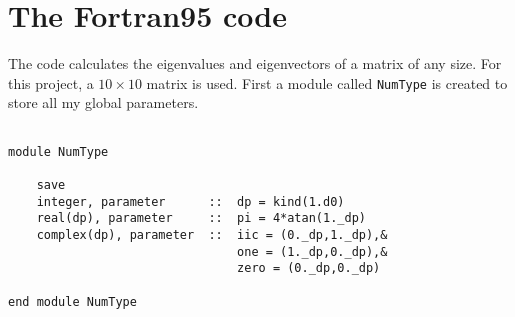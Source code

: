 \documentclass[12pt]{article}
\begin{document}
\section{The Fortran95 code}

The code calculates the eigenvalues and eigenvectors of a matrix of any size. For this project, a $10 \times 10$ matrix is used. First a module called {\tt NumType} is created to store all my global parameters.

\begin{lstlisting}[frame=single,caption={Module {\tt NumType}},label=module]

module NumType

	save
	integer, parameter		::	dp = kind(1.d0)
	real(dp), parameter		::	pi = 4*atan(1._dp)
	complex(dp), parameter	:: 	iic = (0._dp,1._dp),&
								one = (1._dp,0._dp),&
								zero = (0._dp,0._dp)

end module NumType
\end{lstlisting}
\end{document}
